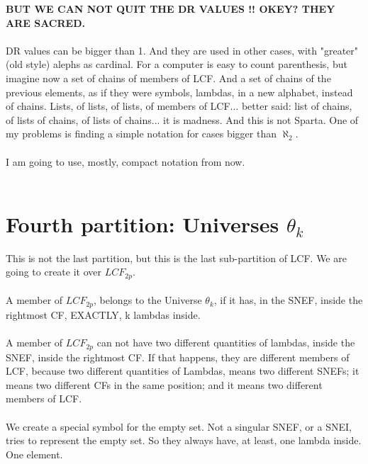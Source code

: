 			\noindent
			\textbf{BUT WE CAN NOT QUIT THE DR VALUES !! OKEY? THEY ARE SACRED.}
			\\\\
			
			\noindent
			DR values can be bigger than 1. And they are used in other cases, with "greater" (old style) alephs as cardinal. For a computer is easy to count parenthesis, but imagine now a set of chains of members of LCF. And a set of chains of the previous elements, as if they were symbols, lambdas, in a new alphabet, instead of chains. Lists, of lists, of lists, of members of LCF... better said: list of chains, of lists of chains, of lists of chains... it is madness. And this is not Sparta. One of my problems is finding a simple notation for cases bigger than $\aleph_{2}$.
			\\\\
			
			\noindent
			I am going to use, mostly, compact notation from now.
			\\\\
		
	\section{Fourth partition: Universes $\theta_{k}$ }
		
		\noindent
		This is not the last partition, but this is the last sub-partition of LCF. We are going to create it over $LCF_{2p}$.
		\\\\
		
		\noindent
		A member of $LCF_{2p}$, belongs to the Universe $\theta_{k}$, if it has, in the SNEF, inside the rightmost CF, EXACTLY, k lambdas inside.
		\\\\
		
		\noindent
		A member of $LCF_{2p}$ can not have two different quantities of lambdas, inside the SNEF, inside the rightmost CF. If that happens, they are different members of LCF, because two different quantities of Lambdas, means two different SNEFs; it means two different CFs in the same position; and it means two different members of LCF.
		\\\\
		
		\noindent
		We create a special symbol for the empty set. Not a singular SNEF, or a SNEI, tries to represent the empty set. So they always have, at least, one lambda inside. One element.
		\\\\
		
